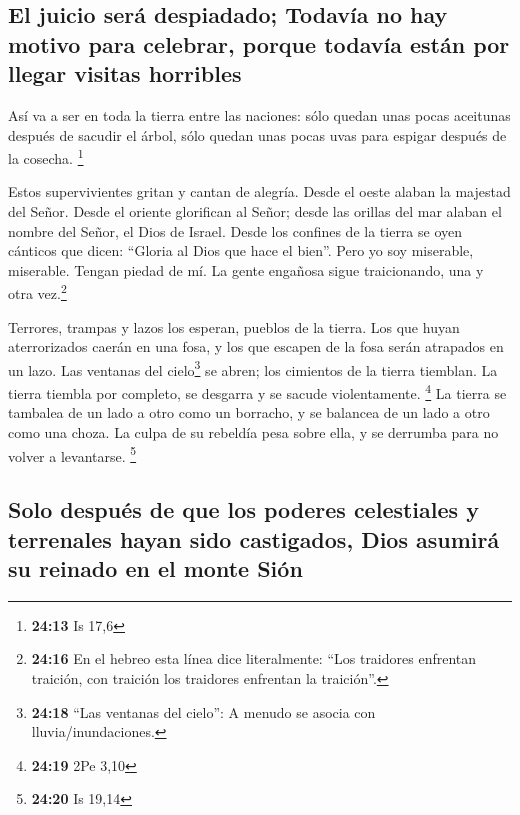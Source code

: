 \hypertarget{el-juicio-seruxe1-despiadado-todavuxeda-no-hay-motivo-para-celebrar-porque-todavuxeda-estuxe1n-por-llegar-visitas-horribles}{%
\subsection{El juicio será despiadado; Todavía no hay motivo para
celebrar, porque todavía están por llegar visitas
horribles}\label{el-juicio-seruxe1-despiadado-todavuxeda-no-hay-motivo-para-celebrar-porque-todavuxeda-estuxe1n-por-llegar-visitas-horribles}}

 Así va a ser en toda la tierra entre las naciones: sólo
quedan unas pocas aceitunas después de sacudir el árbol, sólo quedan
unas pocas uvas para espigar después de la cosecha. \footnote{\textbf{24:13}
  Is 17,6}

 Estos supervivientes gritan y cantan de alegría. Desde
el oeste alaban la majestad del Señor.  Desde el oriente
glorifican al Señor; desde las orillas del mar alaban el nombre del
Señor, el Dios de Israel.  Desde los confines de la
tierra se oyen cánticos que dicen: ``Gloria al Dios que hace el bien''.
Pero yo soy miserable, miserable. Tengan piedad de mí. La gente engañosa
sigue traicionando, una y otra vez.\footnote{\textbf{24:16} En el hebreo
  esta línea dice literalmente: ``Los traidores enfrentan traición, con
  traición los traidores enfrentan la traición''.}

 Terrores, trampas y lazos los esperan, pueblos de la
tierra.  Los que huyan aterrorizados caerán en una fosa,
y los que escapen de la fosa serán atrapados en un lazo. Las ventanas
del cielo\footnote{\textbf{24:18} ``Las ventanas del cielo'': A menudo
  se asocia con lluvia/inundaciones.} se abren; los cimientos de la
tierra tiemblan.  La tierra tiembla por completo, se
desgarra y se sacude violentamente. \footnote{\textbf{24:19} 2Pe 3,10}
 La tierra se tambalea de un lado a otro como un
borracho, y se balancea de un lado a otro como una choza. La culpa de su
rebeldía pesa sobre ella, y se derrumba para no volver a levantarse.
\footnote{\textbf{24:20} Is 19,14}

\hypertarget{solo-despuuxe9s-de-que-los-poderes-celestiales-y-terrenales-hayan-sido-castigados-dios-asumiruxe1-su-reinado-en-el-monte-siuxf3n}{%
\subsection{Solo después de que los poderes celestiales y terrenales
hayan sido castigados, Dios asumirá su reinado en el monte
Sión}\label{solo-despuuxe9s-de-que-los-poderes-celestiales-y-terrenales-hayan-sido-castigados-dios-asumiruxe1-su-reinado-en-el-monte-siuxf3n}}

